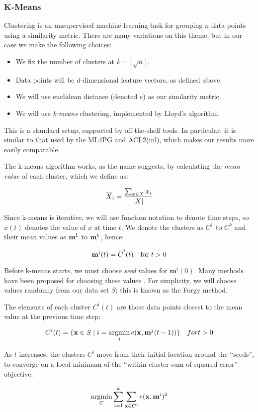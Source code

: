 \subsubsection{K-Means}
\label{sec:kmeans}

Clustering is an unsupervised machine learning task for grouping $n$ data points using a similarity metric. There are many variations on this theme, but in our case we make the following choices:

\begin{itemize}
  \item We fix the number of clusters at $k = \lceil \sqrt{n} \rceil$.
  \item Data points will be $d$-dimensional feature vectors, as defined above.
  \item We will use euclidean distance (denoted $e$) as our similarity metric.
  \item We will use \emph{k-means} clustering, implemented by Lloyd's algorithm.
\end{itemize}

This is a standard setup, supported by off-the-shelf tools. In particular, it is similar to that used by the ML4PG and ACL2(ml), which makes our results more easily comparable.

The k-means algorithm works, as the name suggests, by calculating the \emph{mean value} of each cluster, which we define as:

\begin{equation*}
  \overline{X}_i = \frac{\sum_{x \in X} x_i}{|X|}
\end{equation*}

Since k-means is iterative, we will use function notation to denote time steps, so $x(t)$ denotes the value of $x$ at time $t$. We denote the clusters as $C^1$ to $C^k$ and their mean values as $\mathbf{m}^1$ to $\mathbf{m}^k$, hence:

\begin{equation*}
  \mathbf{m}^i(t) = \overline{C}^i(t) \quad \text{for $t > 0$}
\end{equation*}

Before k-means starts, we must choose \emph{seed} values for $\mathbf{m}^i(0)$. Many methods have been proposed for choosing these values \citep{arthur2007k}. For simplicity, we will choose values randomly from our data set $S$; this is known as the Forgy method.

The elements of each cluster $C^i(t)$ are those data points closest to the mean value at the previous time step:

\begin{equation*}
  C^i(t) = \{ \vect{x} \in S \mid i = \argmin\limits_j e(\vect{x}, \vect{m}^j(t-1)) \} \quad for t > 0
\end{equation*}

As $t$ increases, the clusters $C^i$ move from their initial location around the ``seeds'', to converge on a local minimum of the ``within-cluster sum of squared error'' objective:

\begin{equation*}
  \argmin\limits_C \sum_{i=1}^k \sum_{\vect{x} \in C^i} e(\vect{x}, \vect{m}^i)^2
\end{equation*}
